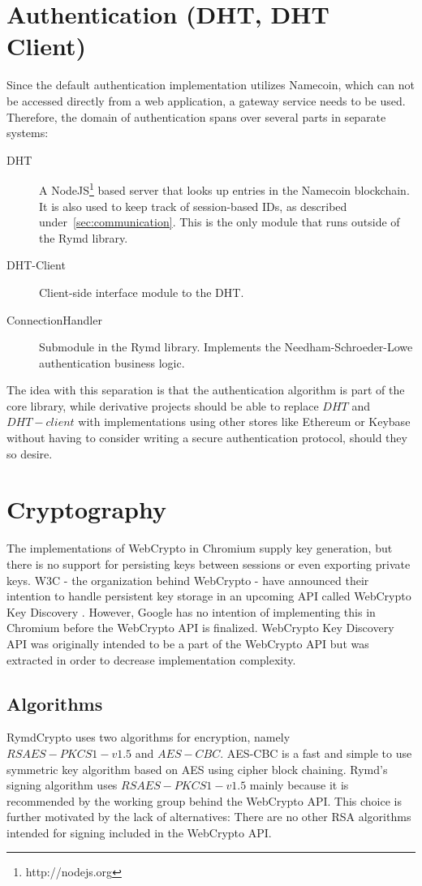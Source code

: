\section{Authentication (DHT, DHT Client)}
\label{sec:authentication}
Since the default authentication implementation utilizes Namecoin, which can not be accessed directly from a web application, a gateway service needs to be used. Therefore, the domain of authentication spans over several parts in separate systems:

\begin{description}
  \item[DHT] A NodeJS\footnote{http://nodejs.org} based server that looks up entries in the Namecoin blockchain. It is also used to keep track of session-based IDs, as described under~\ref{sec:communication}. This is the only module that runs outside of the Rymd library.
  \item[DHT-Client] Client-side interface module to the DHT.
  \item[ConnectionHandler] Submodule in the Rymd library. Implements the Needham-Schroeder-Lowe authentication business logic.
\end{description}

The idea with this separation is that the authentication algorithm is part of the core library, while derivative projects should be able to replace $DHT$ and $DHT-client$ with implementations using other stores like Ethereum or Keybase without having to consider writing a secure authentication protocol, should they so desire.

\section{Cryptography}
\label{sec:cryptography}
The implementations of WebCrypto in Chromium supply key generation, but there is no support for persisting keys between sessions or even exporting private keys. W3C - the organization behind WebCrypto - have announced their intention to handle persistent key storage in an upcoming API called WebCrypto Key Discovery \cite{WebCryptoKeyDiscovery:Online}. However, Google has no intention of implementing this in Chromium before the WebCrypto API is finalized. WebCrypto Key Discovery API was originally intended to be a part of the WebCrypto API but was extracted in order to decrease implementation complexity.

\subsection{Algorithms}
RymdCrypto uses two algorithms for encryption, namely $RSAES-PKCS1-v1.5$ and $AES-CBC$. AES-CBC is a fast and simple to use symmetric key algorithm based on AES using cipher block chaining\cite{AESISFAST:Online}. Rymd's signing algorithm uses $RSAES-PKCS1-v1.5$ mainly because it is recommended by the working group behind the WebCrypto API. This choice is further motivated by the lack of alternatives: There are no other RSA algorithms intended for signing included in the WebCrypto API.

